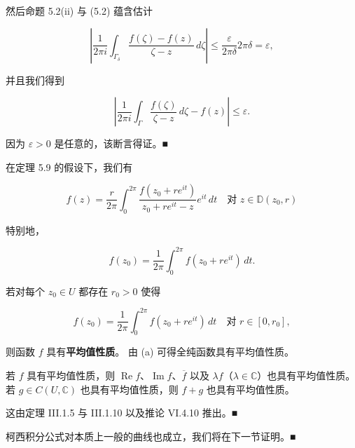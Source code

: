 \begin{theorem}
然后命题 5.2(ii) 与 (5.2) 蕴含估计

\[
\left|\frac{1}{2\pi i}\int_{\Gamma_{\delta}}\frac{f(\zeta) - f(z)}{\zeta - z}\,d\zeta\right| \le \frac{\varepsilon}{2\pi\delta}2\pi\delta = \varepsilon ,
\]

并且我们得到

\[
\left|\frac{1}{2\pi i}\int_{\Gamma}\frac{f(\zeta)}{\zeta - z}\,d\zeta - f(z)\right| \le \varepsilon .
\]

因为 $ \varepsilon > 0 $ 是任意的，该断言得证。\nobreak\hspace{0.35em}■

\end{theorem}

\begin{remark}

\begin{items}
\item

在定理 5.9 的假设下，我们有

\[
f(z) = \frac{r}{2\pi}\int_{0}^{2\pi}\frac{f(z_{0} + re^{it})}{z_{0} + re^{it} - z}e^{it}\,dt \quad \text{对 } z \in \mathbb{D}(z_{0},r)
\]

特别地，

\[
f(z_{0}) = \frac{1}{2\pi}\int_{0}^{2\pi}f(z_{0} + re^{it})\,dt .
\]
\item

若对每个 $ z_{0} \in U $ 都存在 $ r_{0} > 0 $ 使得

\[
f(z_{0}) = \frac{1}{2\pi}\int_{0}^{2\pi}f(z_{0} + re^{it})\,dt \quad \text{对 } r \in [0,r_{0}] ,
\]

则函数 $ f $ 具有\textbf{平均值性质}。
由 (a) 可得全纯函数具有平均值性质。

\item

若 $ f $ 具有平均值性质，则 $ \operatorname{Re} f $、$ \operatorname{Im} f $、$ \overline{f} $ 以及 $ \lambda f $（$ \lambda \in \mathbb{C} $）也具有平均值性质。若 $ g \in C(U,\mathbb{C}) $ 也具有平均值性质，则 $ f + g $ 也具有平均值性质。

\proofhead
这由定理 III.1.5 与 III.1.10 以及推论 VI.4.10 推出。\nobreak\hspace{0.35em}■
\item

柯西积分公式对本质上一般的曲线也成立，我们将在下一节证明。\nobreak\hspace{0.35em}■

\end{items}

\end{remark}

